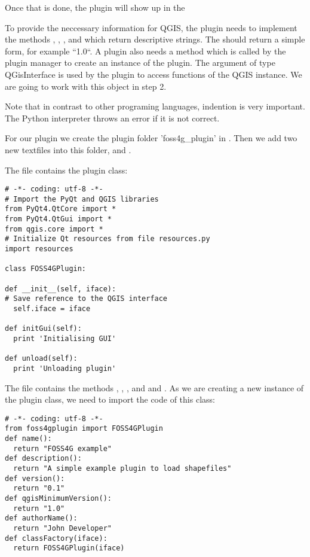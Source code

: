 Once that is done, the plugin will show up in the

To provide the neccessary information for QGIS, the plugin needs to implement
the methods , , ,
 and  which return descriptive strings.
The  should return a simple form, for example ``1.0``. A plugin also needs a method
 which is called by the plugin manager to create
an instance of the plugin. The argument of type QGisInterface is used by the
plugin to access functions of the QGIS instance. We are going to work with
this object in step 2.  

Note that in contrast to other programing languages, indention is very
important. The Python interpreter throws an error if it is not correct.

For our plugin we create the plugin folder 'foss4g\_plugin' in
. Then we add two new textfiles into this
folder,  and .

The file  contains the plugin class:

\begin{verbatim}
# -*- coding: utf-8 -*-
# Import the PyQt and QGIS libraries
from PyQt4.QtCore import *
from PyQt4.QtGui import *
from qgis.core import *
# Initialize Qt resources from file resources.py
import resources

class FOSS4GPlugin:

def __init__(self, iface):
# Save reference to the QGIS interface
  self.iface = iface

def initGui(self):
  print 'Initialising GUI'

def unload(self):
  print 'Unloading plugin'
\end{verbatim}

The file  contains the methods ,
, , 
and  and . As
we are creating a new instance of the plugin class, we need to import the
code of this class:

\begin{verbatim}
# -*- coding: utf-8 -*-
from foss4gplugin import FOSS4GPlugin
def name():
  return "FOSS4G example"
def description():
  return "A simple example plugin to load shapefiles"
def version():
  return "0.1"
def qgisMinimumVersion():
  return "1.0"
def authorName():
  return "John Developer"
def classFactory(iface):
  return FOSS4GPlugin(iface)
\end{verbatim}

